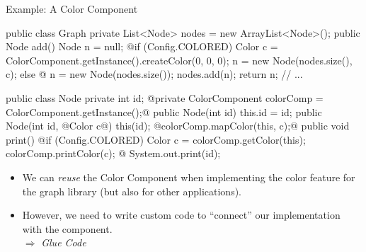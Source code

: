 \begin{frame}[fragile]{Example: A Color Component}
	\begin{mycolumns}[columns=2,widths={60,40},animation=none]
{\small
\begin{codetight}{}
public class Graph {
	private List<Node> nodes = new ArrayList<Node>();
	public Node add() {
		Node n = null;
		@if (Config.COLORED) {
			Color c = ColorComponent.getInstance().createColor(0, 0, 0);
			n = new Node(nodes.size(), c);
		} else @ {
			n = new Node(nodes.size());
		}
		nodes.add(n);
		return n;
	}
	// ...
}
\end{codetight}
}
		\mynextcolumn
\vspace{-0.5cm}
{\small
\begin{codetight}{}
public class Node {
	private int id;
	@private ColorComponent colorComp =
		ColorComponent.getInstance();@
	public Node(int id) { this.id = id; }
	public Node(int id, @Color c@) {
		this(id);
		@colorComp.mapColor(this, c);@
	}
	public void print() {
		@if (Config.COLORED) {
			Color c = colorComp.getColor(this);
			colorComp.printColor(c);
		}@
		System.out.print(id);
	}
}
\end{codetight}
}			
	\end{mycolumns}
	\begin{note}{}
		\begin{itemize}
			\item We can \emph{reuse} the Color Component when implementing the color feature for the graph library (but also for other applications). 
			\item However, we need to write custom code to ``connect'' our implementation with the component.\\
				$\Rightarrow$ \emph{Glue Code}
		\end{itemize}
	\end{note}
\end{frame}

